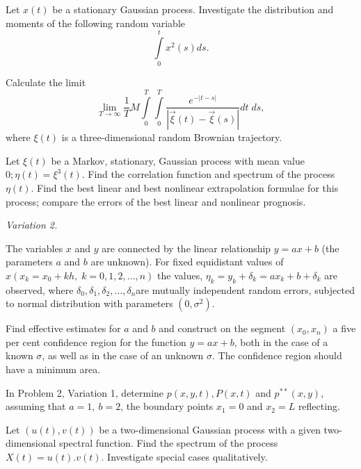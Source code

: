 \begin{problem}%
Let $x(t)$ be a stationary Gaussian process. Investigate the
distribution and moments of the following random variable
$$
\int\limits^t_0 x^2 (s) ds.
$$
\end{problem}

\begin{problem}%
Calculate the limit
$$
\lim\limits_{T \to \infty} \frac{1}{T} M \int\limits^T_0
\int\limits^T_0 \frac{e^{-|t-s|}}{|\vec{\xi} (t) - \vec{\xi} (s)|}
dt \; ds,
$$
where $\xi(t)$ is a three-dimensional random Brownian trajectory.
\end{problem}

\begin{problem}%
Let $\xi (t)$ be a Markov, stationary, Gaussian process with mean
value $0; \eta(t) = \xi^3(t)$. Find the correlation function and
spectrum of the process $\eta(t)$. Find the best linear and best
nonlinear extrapolation formulae for this process; compare the errors
of the best linear and nonlinear prognosis.
\end{problem}

\medskip
\textit{Variation 2.}
\setcounter{problem}{0}
\begin{problem}%
The variables $x$ and $y$ are connected by the linear relationship $y=
ax +b$ (the parameters $a$ and $b$ are unknown). For fixed equidistant
values of $x (x_k = x_0 + kh, \; k = 0,1,2,\ldots, n)$ the values,
$\eta_k = y_k + \delta_k = ax_k + b + \delta_k$ are observed, where
$\delta_0, \delta_1, \delta_2, \ldots, \delta_n$\pageoriginale are
mutually independent random errors, subjected to normal distribution
with parameters $(0,\sigma^2)$.

Find effective estimates for $a$ and $b$ and construct on the segment
$(x_0, x_n)$ a five per cent confidence region for the function $y =
ax + b$, both in the case of a known $\sigma$, as well as in the case
of an unknown $\sigma$. The confidence region should have a minimum area.
\end{problem}

\begin{problem}%
In Problem 2, Variation 1, determine $p (x,y,t), P(x,t)$ and
$p^{\ast\ast} (x,y)$, assuming that $a = 1, ~b=2$, the boundary points
$x_1 =0$ and $x_2 = L$ reflecting. 
\end{problem}

\begin{problem}%
Let $(u(t), v(t))$ be a two-dimensional Gaussian process with a given
two-dimensional spectral function. Find the spectrum of the process
$X(t) = u(t).v(t)$. Investigate special cases qualitatively. 
\end{problem}

